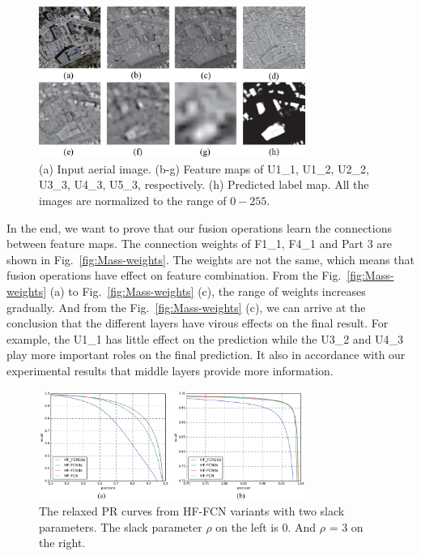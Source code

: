 \begin{figure}  
\begin{center}
\includegraphics[width=8.7cm]{Figures/feature_maps.eps}
\caption{(a) Input aerial image. (b-g) Feature maps of U1\_1, U1\_2, U2\_2, U3\_3, U4\_3, U5\_3, respectively. (h) Predicted label map. All the images are normalized to the range of ${0-255}$.}
\label{fig:feature_maps}
\end{center}
\end{figure}


In the end, we want to prove that our fusion operations learn the connections between feature maps. The connection weights of F1\_1, F4\_1 and Part 3 are shown in Fig.~\ref{fig:Mass-weights}.
The weights are not the same, which means that fusion operations have effect on feature combination.
From the Fig.~\ref{fig:Mass-weights} (a) to Fig.~\ref{fig:Mass-weights} (c), the range of weights increases gradually. 
And from the Fig.~\ref{fig:Mass-weights} (c), we can arrive at the conclusion that the different layers have virous effects on the final result.
For example, the U1\_1 has little effect on the prediction while the U3\_2 and U4\_3 play more important roles on the final prediction.
It also in accordance with our experimental results that middle layers provide more information.

\begin{figure}
\vspace{-0.2cm}
\setlength{\abovecaptionskip}{-0cm}
\setlength{\belowcaptionskip}{-2cm}  
\centering
\includegraphics[width=8.7cm]{Figures/HF-FCN-variant-PR.eps}
\caption{The relaxed PR curves from HF-FCN variants with two slack parameters. The slack parameter $\rho$ on the left is 0. And $\rho$ = 3 on the right.}
\label{fig:Mass-variants-PR}
\end{figure}

